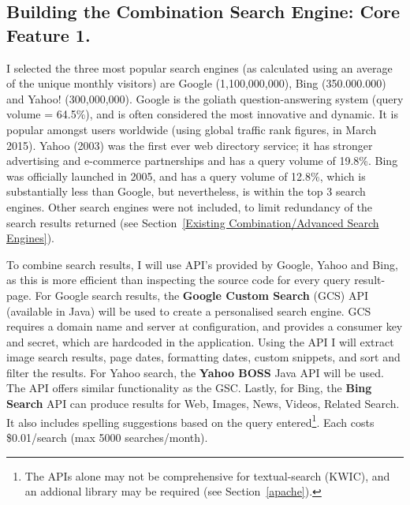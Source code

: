 \documentclass[a4paper, 10pt]{article}
\begin{document}
\subsection{Building the Combination Search Engine: Core Feature 1.} 
I selected the three most popular search engines (as calculated using an average of the unique monthly visitors) are Google (1,100,000,000), Bing (350.000.000) and Yahoo! (300,000,000)\cite{ebiz}. Google is the goliath question-answering system (query volume = 64.5\%)\cite{adam}, and is often considered the most innovative and dynamic. It is popular amongst users worldwide (using global traffic rank figures, in March 2015). Yahoo (2003) was the first ever web directory service; it has stronger advertising and e-commerce partnerships and has a query volume of 19.8\%. Bing was officially launched in 2005, and has a query volume of 12.8\%, which is substantially less than Google, but nevertheless, is within the top 3 search engines. Other search engines were not included, to limit redundancy of the search results returned (see Section~\ref{Existing Combination/Advanced Search Engines}). 

To combine search results, I will use API’s provided by Google, Yahoo and Bing, as this is more efficient than inspecting the source code for every query result-page. For Google search results, the \textbf{Google Custom Search} (GCS) API (available in Java) will be used to create a personalised search engine. GCS requires a domain name and server at configuration, and provides a consumer key and secret, which are hardcoded in the application. Using the API I will extract image search results, page dates, formatting dates, custom snippets, and sort and filter the results. For Yahoo search, the \textbf{Yahoo BOSS} Java API will be used. The API offers similar functionality as the GSC. Lastly, for Bing, the \textbf{Bing Search} API can produce results for Web, Images, News, Videos, Related Search. It also includes spelling suggestions based on the query entered\footnote{The APIs alone may not be comprehensive for textual-search (KWIC), and an addional library may be required (see Section~\ref{apache}).}. Each costs \$0.01/search (max 5000 searches/month).
\end{document}

